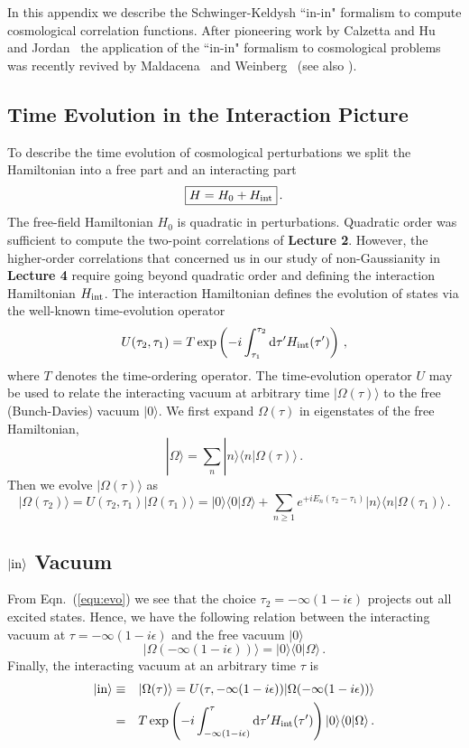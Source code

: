 \documentclass[12pt,letterpaper,rotate]{article}
\def\beq{\begin{equation}}
\def\eeq{\end{equation}}
\def\bea{\begin{eqnarray}}
\def\eea{\end{eqnarray}}
\def\d{{\rm d}}
\begin{document}
{In this appendix we describe the Schwinger-Keldysh ``in-in" formalism \cite{Schwinger:1960qe} to compute cosmological correlation functions.
After pioneering work by Calzetta and Hu~\cite{Calzetta:1986ey} and Jordan~\cite{Jordan:1986ug} the application of the ``in-in" formalism to cosmological problems was recently revived by Maldacena~\cite{malda} and Weinberg~\cite{Weinberg:2005vy} (see also \cite{Seery:2007we, Adshead:2009cb}).


\subsection{Time Evolution in the Interaction Picture}

To describe the time evolution of cosmological perturbations we split the Hamiltonian into a free part and an interacting part
\beq
\fbox{$\displaystyle
H = H_0 + H_{\rm int} $}\, .
\eeq
The free-field Hamiltonian $H_0$ is quadratic in perturbations. Quadratic order was sufficient to compute the two-point correlations of {\bf Lecture 2}. However, the higher-order correlations that concerned us in our study of non-Gaussianity in {\bf Lecture 4} require going beyond quadratic order and defining the interaction Hamiltonian $H_{\rm int}$. The interaction Hamiltonian defines the evolution of states via the well-known time-evolution operator
\beq
U(\tau_2, \tau_1) = T \exp \left( - i \int_{\tau_1}^{\tau_2} \d \tau' H_{\rm int}(\tau') \right)\, ,
\eeq 
where $T$ denotes the time-ordering operator.  The time-evolution operator $U$ may be used to relate the interacting vacuum at arbitrary time $|\Omega(\tau) \rangle$ to the free (Bunch-Davies) vacuum $| 0 \rangle$.
We first expand $\Omega(\tau)$ in eigenstates of the free Hamiltonian,
\beq
| \Omega \rangle = \sum_n |n \rangle \langle n | \Omega(\tau) \rangle\, .
\eeq
Then we evolve $| \Omega(\tau) \rangle$ as
\beq
\label{equ:evo}
|\Omega(\tau_2) \rangle = U(\tau_2, \tau_1) | \Omega(\tau_1) \rangle = |0 \rangle \langle 0 | \Omega \rangle + \sum_{n \ge 1} e^{+ i E_n(\tau_2 - \tau_1)} | n \rangle \langle n | \Omega(\tau_1) \rangle \, .
\eeq

\subsection{$| {\rm in}\rangle$ Vacuum}

From Eqn.~(\ref{equ:evo}) we see that the choice $\tau_2 = - \infty (1- i \epsilon)$ projects out all excited states. Hence, we have the following relation between the interacting vacuum at $\tau= - \infty(1-i \epsilon)$ and the free vacuum $| 0 \rangle$
\beq
|\Omega(-\infty(1-i\epsilon)) \rangle = |0\rangle \langle 0 | \Omega \rangle\, .
\eeq
Finally, the interacting vacuum at an arbitrary time $\tau$ is
\bea
| {\rm in} \rangle &\equiv& |\Omega(\tau) \rangle  = U(\tau, -\infty(1-i\epsilon)) | \Omega(-\infty(1-i \epsilon)) \rangle \\
&=& T \exp \left( -i \int_{-\infty(1-i \epsilon)}^\tau \d \tau' H_{\rm int}(\tau')\right) | 0 \rangle \langle 0 | \Omega \rangle\, .
\eea

}
\end{document}
